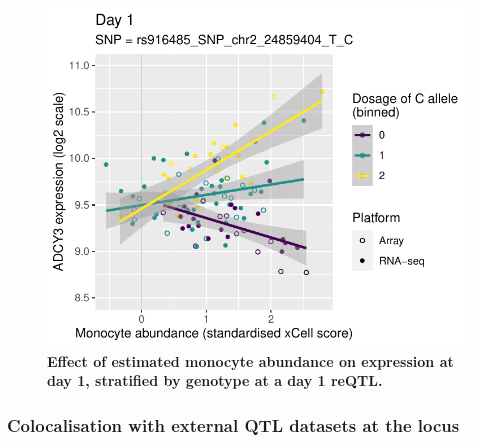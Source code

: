 \begin{figure}
    \centering
    \includegraphics[width=1.0\textwidth,page=1]{mainmatter/figures/chapter_03/lme4qtl.ENSG00000138031_Monocyte_day1.pdf}
    \caption{
        \textbf{Effect of estimated monocyte abundance on  expression at day 1, stratified by genotype at a day 1  \gls{reQTL}.}
    }
    \label{fig:hird_reQTL_ADCY3_vs_monocyte_day1}
\end{figure}

%
%
%

\subsubsection{Colocalisation with external QTL datasets at the  locus}

